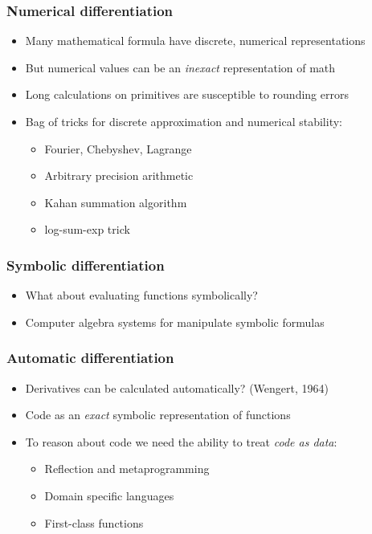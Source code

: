 \documentclass{beamer}
\begin{document}

    \begin{frame}
        \frametitle{Numerical differentiation}
        \begin{itemize}
            \item Many mathematical formula have discrete, numerical representations
            \item But numerical values can be an \textit{inexact} representation of math
            \item Long calculations on primitives are susceptible to rounding errors
            \item Bag of tricks for discrete approximation and numerical stability:
            \begin{itemize}
                \item Fourier, Chebyshev, Lagrange
                \item Arbitrary precision arithmetic
                \item Kahan summation algorithm
                \item log-sum-exp trick
            \end{itemize}
        \end{itemize}
    \end{frame}


    \begin{frame}
        \frametitle{Symbolic differentiation}
        \begin{itemize}
            \item What about evaluating functions symbolically?
            \item Computer algebra systems for manipulate symbolic formulas
        \end{itemize}
    \end{frame}


    \begin{frame}
        \frametitle{Automatic differentiation}
        \begin{itemize}
            \item Derivatives can be calculated automatically? (Wengert, 1964)
            \item Code as an \textit{exact} symbolic representation of functions
            \item To reason about code we need the ability to treat \textit{code as data}:
            \begin{itemize}
                \item Reflection and metaprogramming
                \item Domain specific languages
                \item First-class functions
            \end{itemize}
        \end{itemize}
    \end{frame}
\end{document}
